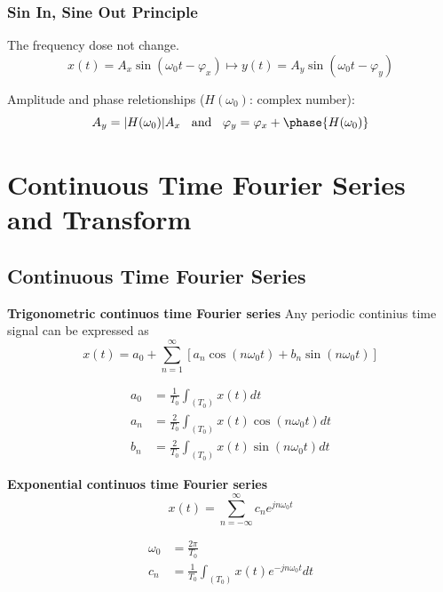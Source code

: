 \begin{multicols}{2}
\subsubsection{Sin In, Sine Out Principle}
The frequency dose not change.
\begin{equation}
    x(t)=A_x\sin(\omega_0t-\varphi_x) \mapsto y(t)=A_y\sin(\omega_0t-\varphi_y)
\end{equation}

Amplitude and phase reletionships ($H(\omega_0)$: complex number):
\begin{equation}
    A_y=|H(\omega_0)|A_x \;\; \text{ and } \;\; \varphi_y=\varphi_x+\phase{H(\omega_0)}
\end{equation}


\section{Continuous Time Fourier Series and Transform}
\subsection{Continuous Time Fourier Series}
\textbf{Trigonometric continuos time Fourier series}
Any periodic continius time signal can be expressed as
\begin{equation*}
    x(t) = a_0 + \sum_{n=1}^{\infty} [a_n\cos(n\omega_0t) + b_n\sin(n\omega_0t)]
\end{equation*}

\begin{align*}
    a_0 &= \frac{1}{T_0}\int_{(T_0)} x(t) dt \\
    a_n &= \frac{2}{T_0}\int_{(T_0)} x(t)\cos(n\omega_0t) dt \\
    b_n &= \frac{2}{T_0}\int_{(T_0)} x(t)\sin(n\omega_0t) dt
\end{align*}

\textbf{Exponential continuos time Fourier series}
\begin{equation*}
    x(t) = \sum_{n=-\infty}^{\infty} c_n e^{jn\omega_0t}
\end{equation*}

\begin{align*}
    \omega_0 &= \frac{2\pi}{T_0} \\
    c_n &= \frac{1}{T_0}\int_{(T_0)} x(t)e^{-jn\omega_0t} dt
\end{align*}



\end{multicols}
